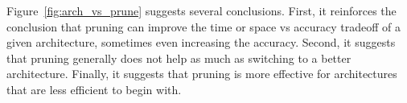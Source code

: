 
Figure~\ref{fig:arch_vs_prune} suggests several conclusions. First, it reinforces the conclusion that pruning can improve the time or space vs accuracy tradeoff of a given architecture, sometimes even increasing the accuracy. Second, it suggests that pruning generally does not help as much as switching to a better architecture. Finally, it suggests that pruning is more effective for architectures that are less efficient to begin with. %




